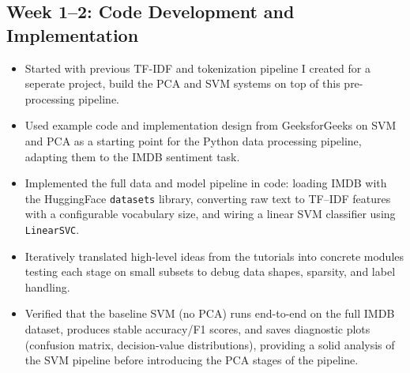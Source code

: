 \documentclass[runningheads]{llncs}
\begin{document}
\subsection*{Week 1--2: Code Development and Implementation}
\begin{itemize}
  \item Started with previous TF-IDF and tokenization pipeline I created for a seperate project, build the PCA and SVM systems on top of this pre-processing pipeline.
  \item Used example code and implementation design from GeeksforGeeks on SVM and PCA \cite{geeksforgeeks_svm,geeksforgeeks_pca} as a starting point for the Python data processing pipeline, adapting them to the IMDB sentiment task.
  \item Implemented the full data and model pipeline in code: loading IMDB with the HuggingFace \texttt{datasets} library, converting raw text to TF--IDF features with a configurable vocabulary size, and wiring a linear SVM classifier using \texttt{LinearSVC}.
  \item Iteratively translated high-level ideas from the tutorials into concrete modules testing each stage on small subsets to debug data shapes, sparsity, and label handling.
  \item Verified that the baseline SVM (no PCA) runs end-to-end on the full IMDB dataset, produces stable accuracy/F1 scores, and saves diagnostic plots (confusion matrix, decision-value distributions), providing a solid analysis of the SVM pipeline before introducing the PCA stages of the pipeline.
\end{itemize}
\end{document}
